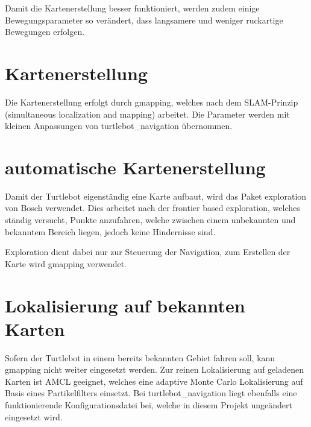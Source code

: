 Damit die Kartenerstellung besser funktioniert, werden zudem einige Bewegungsparameter so verändert, dass langsamere und weniger ruckartige Bewegungen erfolgen.

\section{Kartenerstellung}
Die Kartenerstellung erfolgt durch gmapping, welches nach dem SLAM-Prinzip (simultaneous localization and mapping) arbeitet. Die Parameter werden mit kleinen Anpassungen von turtlebot\_navigation übernommen.

\section{automatische Kartenerstellung}
Damit der Turtlebot eigenständig eine Karte aufbaut, wird das Paket exploration von Bosch verwendet. Dies arbeitet nach der frontier based exploration, welches ständig versucht, Punkte anzufahren, welche zwischen einem unbekannten und bekanntem Bereich liegen, jedoch keine Hindernisse sind.

Exploration dient dabei nur zur Steuerung der Navigation, zum Erstellen der Karte wird gmapping verwendet.

\section{Lokalisierung auf bekannten Karten}
Sofern der Turtlebot in einem bereits bekannten Gebiet fahren soll, kann gmapping nicht weiter eingesetzt werden. Zur reinen Lokalisierung auf geladenen Karten ist AMCL geeignet, welches eine adaptive Monte Carlo Lokalisierung auf Basis eines Partikelfilters einsetzt. Bei turtlebot\_navigation liegt ebenfalls eine funktionierende Konfigurationsdatei bei, welche in diesem Projekt ungeändert eingesetzt wird.



